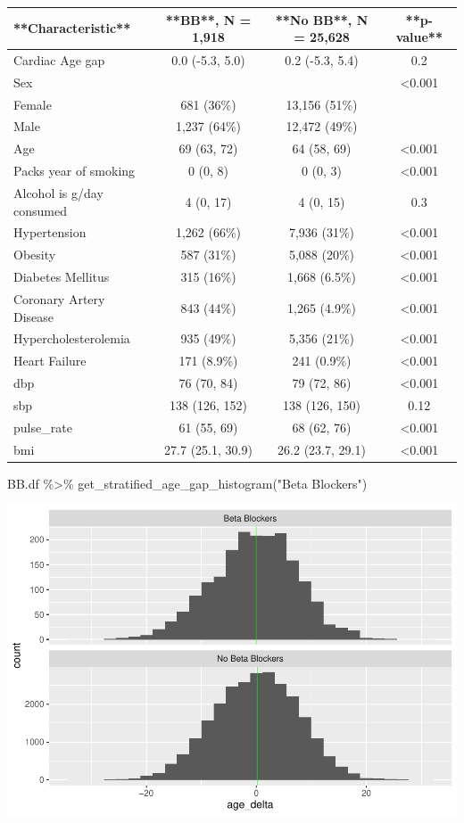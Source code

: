 \documentclass[
]{article}
\newenvironment{Shaded}{\begin{snugshade}}{\end{snugshade}}
\newcommand{\FunctionTok}[1]{\textcolor[rgb]{0.00,0.00,0.00}{#1}}
\newcommand{\NormalTok}[1]{#1}
\newcommand{\SpecialCharTok}[1]{\textcolor[rgb]{0.00,0.00,0.00}{#1}}
\newcommand{\StringTok}[1]{\textcolor[rgb]{0.31,0.60,0.02}{#1}}
\begin{document}
\begin{tabular}{l|c|c|c}
\hline
**Characteristic** & **BB**, N = 1,918 & **No BB**, N = 25,628 & **p-value**\\
\hline
Cardiac Age gap & 0.0 (-5.3, 5.0) & 0.2 (-5.3, 5.4) & 0.2\\
\hline
Sex &  &  & <0.001\\
\hline
Female & 681 (36\%) & 13,156 (51\%) & \\
\hline
Male & 1,237 (64\%) & 12,472 (49\%) & \\
\hline
Age & 69 (63, 72) & 64 (58, 69) & <0.001\\
\hline
Packs year of smoking & 0 (0, 8) & 0 (0, 3) & <0.001\\
\hline
Alcohol is g/day consumed & 4 (0, 17) & 4 (0, 15) & 0.3\\
\hline
Hypertension & 1,262 (66\%) & 7,936 (31\%) & <0.001\\
\hline
Obesity & 587 (31\%) & 5,088 (20\%) & <0.001\\
\hline
Diabetes Mellitus & 315 (16\%) & 1,668 (6.5\%) & <0.001\\
\hline
Coronary Artery Disease & 843 (44\%) & 1,265 (4.9\%) & <0.001\\
\hline
Hypercholesterolemia & 935 (49\%) & 5,356 (21\%) & <0.001\\
\hline
Heart Failure & 171 (8.9\%) & 241 (0.9\%) & <0.001\\
\hline
dbp & 76 (70, 84) & 79 (72, 86) & <0.001\\
\hline
sbp & 138 (126, 152) & 138 (126, 150) & 0.12\\
\hline
pulse\_rate & 61 (55, 69) & 68 (62, 76) & <0.001\\
\hline
bmi & 27.7 (25.1, 30.9) & 26.2 (23.7, 29.1) & <0.001\\
\hline
\end{tabular}

\begin{Shaded}
\begin{Highlighting}[]
\NormalTok{BB.df }\SpecialCharTok{\%\textgreater{}\%} 
 \FunctionTok{get\_stratified\_age\_gap\_histogram}\NormalTok{(}\StringTok{"Beta Blockers"}\NormalTok{)}
\end{Highlighting}
\end{Shaded}

\includegraphics{../results/report_files/figure-latex/BB-age-gap-histograms-1.pdf}
\end{document}
